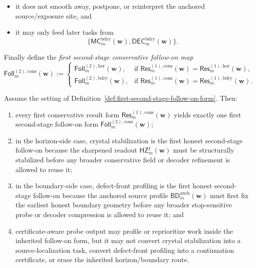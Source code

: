 \begin{definition}
\begin{enumerate}[label=(\roman*)]
\begin{itemize}[leftmargin=2em]
 \item it does not smooth away, postpone, or reinterpret the anchored source/exposure site, and
 \item it may only feed later tasks from
 \[
 \{\mathsf{MC}^{\mathrm{bdry}}_{m}(\mathbf w),\mathsf{DEC}^{\mathrm{bdry}}_{m}(\mathbf w)\}.
 \]
 \end{itemize}
\end{enumerate}
Finally define the \emph{first second-stage conservative follow-on map}
\[
 \mathsf{Foll}^{(2),\mathrm{cons}}_{m}(\mathbf w)
 :=
 \begin{cases}
 \mathsf{Foll}^{(2),\mathrm{hor}}_{m}(\mathbf w), & \text{if }\mathsf{Res}^{(1),\mathrm{cons}}_{m}(\mathbf w)=\mathsf{Res}^{(1),\mathrm{hor}}_{m}(\mathbf w),\\[2mm]
 \mathsf{Foll}^{(2),\mathrm{bdry}}_{m}(\mathbf w), & \text{if }\mathsf{Res}^{(1),\mathrm{cons}}_{m}(\mathbf w)=\mathsf{Res}^{(1),\mathrm{bdry}}_{m}(\mathbf w).
 \end{cases}
\]
\end{definition}

\begin{proposition}
\label{prop:every-first-conservative-result-surface-yields-exactly-one-first-second-stage-follow-on-form}
Assume the setting of Definition~\ref{def:first-second-stage-follow-on-form}. Then:
\begin{enumerate}[label=(\roman*)]
 \item every first conservative result form \(\mathsf{Res}^{(1),\mathrm{cons}}_{m}(\mathbf w)\) yields exactly one first second-stage follow-on form \(\mathsf{Foll}^{(2),\mathrm{cons}}_{m}(\mathbf w)\);
 \item in the horizon-side case, crystal stabilization is the first honest second-stage follow-on because the sharpened readout \(\mathsf{HZ}^{\sharp}_{m}(\mathbf w)\) must be structurally stabilized before any broader conservative field or decoder refinement is allowed to reuse it;
 \item in the boundary-side case, defect-front profiling is the first honest second-stage follow-on because the anchored source profile \(\mathsf{BD}^{\mathrm{anch}}_{m}(\mathbf w)\) must first fix the earliest honest boundary geometry before any broader stop-sensitive probe or decoder compression is allowed to reuse it; and
 \item certificate-aware probe output may profile or reprioritize work inside the inherited follow-on form, but it may not convert crystal stabilization into a source-localization task, convert defect-front profiling into a continuation certificate, or erase the inherited horizon/boundary route.
\end{enumerate}
\end{proposition}

